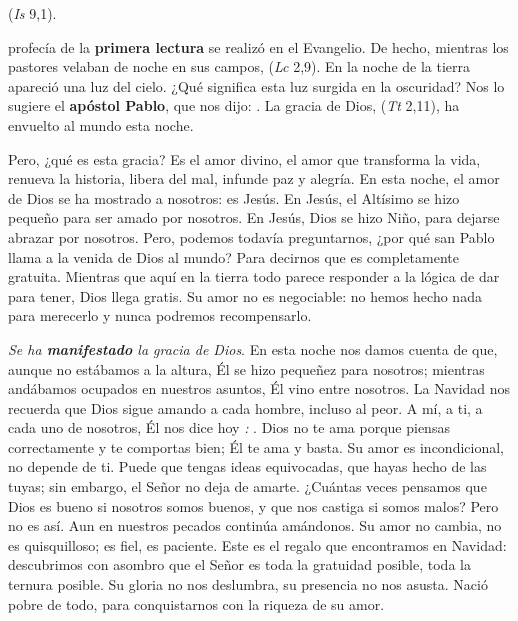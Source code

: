 \begin{body}
	 (\emph{Is} 9,1). 
	
	 profecía de la \textbf{primera lectura} se realizó en el Evangelio. De hecho, mientras los pastores velaban de noche en sus campos,  (\emph{Lc} 2,9). En la noche de la tierra apareció una luz del cielo. ¿Qué significa esta luz surgida en la oscuridad? Nos lo sugiere el \textbf{apóstol Pablo}, que nos dijo: . La gracia de Dios,  (\emph{Tt} 2,11), ha envuelto al mundo esta noche.
	
	Pero, ¿qué es esta gracia? Es el amor divino, el amor que transforma la vida, renueva la historia, libera del mal, infunde paz y alegría. En esta noche, el amor de Dios se ha mostrado a nosotros: es Jesús. En Jesús, el Altísimo se hizo pequeño para ser amado por nosotros. En Jesús, Dios se hizo Niño, para dejarse abrazar por nosotros. Pero, podemos todavía preguntarnos, ¿por qué san Pablo llama  a la venida de Dios al mundo? Para decirnos que es completamente gratuita. Mientras que aquí en la tierra todo parece responder a la lógica de dar para tener, Dios llega gratis. Su amor no es negociable: no hemos hecho nada para merecerlo y nunca podremos recompensarlo.
	
	\emph{Se ha \textbf{manifestado} la gracia de Dios}. En esta noche nos damos cuenta de que, aunque no estábamos a la altura, Él se hizo pequeñez para nosotros; mientras andábamos ocupados en nuestros asuntos, Él vino entre nosotros. La Navidad nos recuerda que Dios sigue amando a cada hombre, incluso al peor. A mí, a ti, a cada uno de nosotros, Él nos dice hoy \emph{:} . Dios no te ama porque piensas correctamente y te comportas bien; Él te ama y basta. Su amor es incondicional, no depende de ti. Puede que tengas ideas equivocadas, que hayas hecho de las tuyas; sin embargo, el Señor no deja de amarte. ¿Cuántas veces pensamos que Dios es bueno si nosotros somos buenos, y que nos castiga si somos malos? Pero no es así. Aun en nuestros pecados continúa amándonos. Su amor no cambia, no es quisquilloso; es fiel, es paciente. Este es el regalo que encontramos en Navidad: descubrimos con asombro que el Señor es toda la gratuidad posible, toda la ternura posible. Su gloria no nos deslumbra, su presencia no nos asusta. Nació pobre de todo, para conquistarnos con la riqueza de su amor.
	

\end{body}
